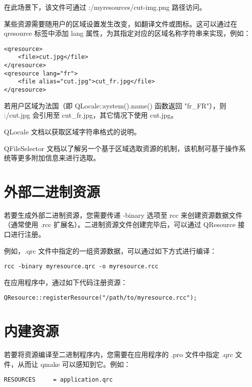 在此场景下，该文件可通过 :/myresources/cut-img.png 路径访问。

某些资源需要随用户的区域设置发生改变，如翻译文件或图标。这可以通过在 qresource 标签中添加 lang 属性，为其指定对应的区域名称字符串来实现，例如：

\begin{lstlisting}
<qresource>
    <file>cut.jpg</file>
</qresource>
<qresource lang="fr">
    <file alias="cut.jpg">cut_fr.jpg</file>
</qresource>
\end{lstlisting}

若用户区域为法国（即 QLocale::system().name() 函数返回 "fr\_FR"），则 :/cut.jpg 会引用至 cut\_fr.jpg，其它情况下使用 cut.jpg。

\begin{seeAlso}
QLocale 文档以获取区域字符串格式的说明。
\end{seeAlso}

\begin{seeAlso}
QFileSelector 文档以了解另一个基于区域选取资源的机制，该机制可基于操作系统等更多附加信息来进行选取。
\end{seeAlso}

\section{外部二进制资源}

若要生成外部二进制资源，您需要传递 -binary 选项至 rcc 来创建资源数据文件（通常使用 .rcc 扩展名）。二进制资源文件创建完毕后，可以通过 QResource 接口进行注册。

例如，.qrc 文件中指定的一组资源数据，可以通过如下方式进行编译：

\begin{lstlisting}
rcc -binary myresource.qrc -o myresource.rcc
\end{lstlisting}

在应用程序中，通过如下代码注册资源：

\begin{lstlisting}
QResource::registerResource("/path/to/myresource.rcc");
\end{lstlisting}

\section{内建资源}

若要将资源编译至二进制程序内，您需要在应用程序的 .pro 文件中指定 .qrc 文件，从而让 qmake 可以感知到它。例如：

\begin{lstlisting}
RESOURCES     = application.qrc
\end{lstlisting}

